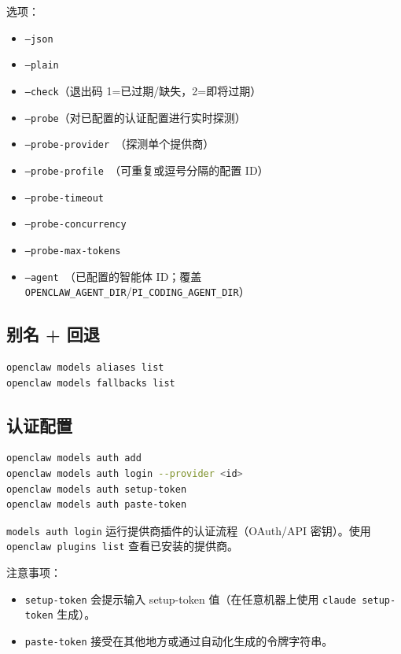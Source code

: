 选项：

\begin{itemize}
  \item \texttt{--json}
  \item \texttt{--plain}
  \item \texttt{--check}（退出码 1=已过期/缺失，2=即将过期）
  \item \texttt{--probe}（对已配置的认证配置进行实时探测）
  \item \texttt{--probe-provider }（探测单个提供商）
  \item \texttt{--probe-profile }（可重复或逗号分隔的配置 ID）
  \item \texttt{--probe-timeout }
  \item \texttt{--probe-concurrency }
  \item \texttt{--probe-max-tokens }
  \item \texttt{--agent }（已配置的智能体 ID；覆盖 \texttt{OPENCLAW\_AGENT\_DIR}/\texttt{PI\_CODING\_AGENT\_DIR}）
\end{itemize}


\subsection{别名 + 回退}


\begin{lstlisting}[language=bash]
openclaw models aliases list
openclaw models fallbacks list
\end{lstlisting}


\subsection{认证配置}


\begin{lstlisting}[language=bash]
openclaw models auth add
openclaw models auth login --provider <id>
openclaw models auth setup-token
openclaw models auth paste-token
\end{lstlisting}


\texttt{models auth login} 运行提供商插件的认证流程（OAuth/API 密钥）。使用
\texttt{openclaw plugins list} 查看已安装的提供商。

注意事项：

\begin{itemize}
  \item \texttt{setup-token} 会提示输入 setup-token 值（在任意机器上使用 \texttt{claude setup-token} 生成）。
  \item \texttt{paste-token} 接受在其他地方或通过自动化生成的令牌字符串。
\end{itemize}



